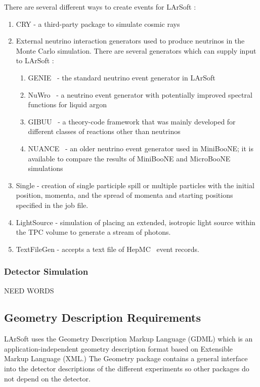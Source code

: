 \documentclass[12pt]{elsarticle}
\newcommand{\larsoft}{LArSoft }
\begin{document}
There are several different ways to create events for \larsoft:
\begin{enumerate}
\item{CRY - a third-party package to simulate cosmic rays~\cite{cry}}
\item{External neutrino interaction generators used to produce neutrinos in the Monte Carlo simulation. There are several generators which can supply input to \larsoft:}
\begin{enumerate}
\item{GENIE~\cite{genie} - the standard neutrino event generator in \larsoft}
\item{NuWro~\cite{nuwro} - a neutrino event generator with potentially improved spectral functions for liquid argon}
\item{GIBUU~\cite{gibuu} - a theory-code framework that was mainly developed for different classes of reactions other than neutrinos}
\item{NUANCE~\cite{nuance} - an older neutrino event generator used in MiniBooNE; it is available to compare the results of MiniBooNE and MicroBooNE simulations}
\end{enumerate}
\item{Single - creation of single participle spill or multiple particles with the initial position, momenta, and the spread of momenta and starting positions specified in the job file.}
\item{LightSource - simulation of placing an extended, isotropic light source within the TPC volume to generate a stream of photons.}
\item{TextFileGen - accepts a text file of HepMC~\cite{hepmc} event records.}
\end{enumerate}

\subsubsection{Detector Simulation}
NEED WORDS

\subsection{Geometry Description Requirements}
\label{sec-geom-desc}
\larsoft uses the Geometry Description Markup Language (GDML) which is an application-independent geometry description format based on Extensible Markup Language (XML.) 
The Geometry package contains a general interface into the detector descriptions of the different experiments so other packages do not depend on the detector. 
\end{document}
